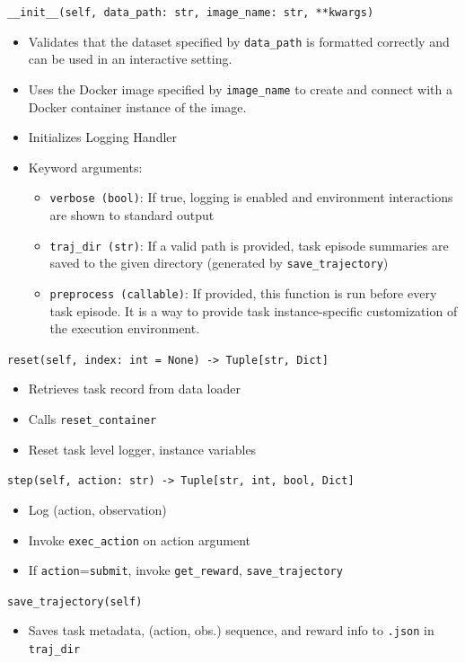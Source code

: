 \texttt{\_\_init\_\_(self, data\_path: str, image\_name: str, **kwargs)}
\begin{itemize}[noitemsep,topsep=0pt]
    \item Validates that the dataset specified by \texttt{data\_path} is formatted correctly and can be used in an interactive setting.
    \item Uses the Docker image specified by \texttt{image\_name} to create and connect with a Docker container instance of the image.
    \item Initializes Logging Handler
    \item Keyword arguments:
    \begin{itemize}[noitemsep]
        \item \texttt{verbose (bool)}: If true, logging is enabled and environment interactions are shown to standard output
        \item \texttt{traj\_dir (str)}: If a valid path is provided, task episode summaries are saved to the given directory (generated by \texttt{save\_trajectory})
        \item \texttt{preprocess (callable)}: If provided, this function is run before every task episode. It is a way to provide task instance-specific customization of the execution environment.
    \end{itemize}
\end{itemize}

\texttt{reset(self, index: int = None) -> Tuple[str, Dict]}
\begin{itemize}[noitemsep,topsep=0pt]
    \item Retrieves task record from data loader
    \item Calls \texttt{reset\_container}
    \item Reset task level logger, instance variables
\end{itemize}

\texttt{step(self, action: str) -> Tuple[str, int, bool, Dict]}
\begin{itemize}[noitemsep,topsep=0pt]
    \item Log (action, observation)
    \item Invoke \texttt{exec\_action} on action argument
    \item If \texttt{action}=\texttt{submit}, invoke \texttt{get\_reward}, \texttt{save\_trajectory}
\end{itemize}

\texttt{save\_trajectory(self)}
\begin{itemize}[noitemsep,topsep=0pt]
    \item Saves task metadata, (action, obs.) sequence, and reward info to \texttt{.json} in \texttt{traj\_dir}
\end{itemize}

